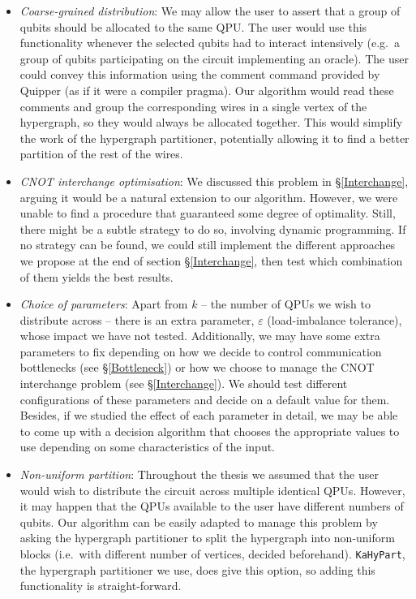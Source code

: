 \begin{itemize}
  \item \textit{Coarse-grained distribution}: We may allow the user to assert that a group of qubits should be allocated to the same QPU. The user would use this functionality whenever the selected qubits had to interact intensively (e.g.\ a group of qubits participating on the circuit implementing an oracle). The user could convey this information using the comment command provided by Quipper (as if it were a compiler pragma). Our algorithm would read these comments and group the corresponding wires in a single vertex of the hypergraph, so they would always be allocated together. This would simplify the work of the hypergraph partitioner, potentially allowing it to find a better partition of the rest of the wires.
  \item \textit{CNOT interchange optimisation}: We discussed this problem in \S\ref{Interchange}, arguing it would be a natural extension to our algorithm. However, we were unable to find a procedure that guaranteed some degree of optimality. Still, there might be a subtle strategy to do so, involving dynamic programming. If no strategy can be found, we could still implement the different approaches we propose at the end of section \S\ref{Interchange}, then test which combination of them yields the best results.
  \item \textit{Choice of parameters}: Apart from \(k\) -- the number of QPUs we wish to distribute across -- there is an extra parameter, \(\varepsilon\) (load-imbalance tolerance), whose impact we have not tested. Additionally, we may have some extra parameters to fix depending on how we decide to control communication bottlenecks (see \S\ref{Bottleneck}) or how we choose to manage the CNOT interchange problem (see \S\ref{Interchange}). We should test different configurations of these parameters and decide on a default value for them. Besides, if we studied the effect of each parameter in detail, we may be able to come up with a decision algorithm that chooses the appropriate values to use depending on some characteristics of the input.
  \item \textit{Non-uniform partition}: Throughout the thesis we assumed that the user would wish to distribute the circuit across multiple identical QPUs. However, it may happen that the QPUs available to the user have different numbers of qubits. Our algorithm can be easily adapted to manage this problem by asking the hypergraph partitioner to split the hypergraph into non-uniform blocks (i.e.\ with different number of vertices, decided beforehand). \texttt{KaHyPart}, the hypergraph partitioner we use, does give this option, so adding this functionality is straight-forward.

\end{itemize}
